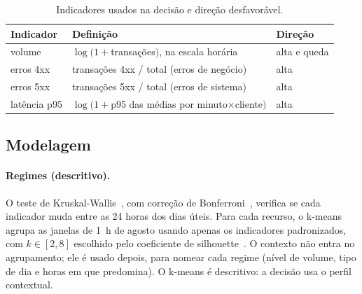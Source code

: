 \documentclass[sigconf,nonacm]{acmart}
\begin{document}
\begin{table}[t]
  \caption{Indicadores usados na decisão e direção desfavorável.}
  \label{tab:atributos}
  \small
  \begin{tabular}{p{}p{}p{}}
    \toprule
    Indicador & Definição & Direção \\
    \midrule
    volume & $\log(1+$transações$)$, na escala horária & alta e queda \\
    erros 4xx & transações 4xx / total (erros de negócio) & alta \\
    erros 5xx & transações 5xx / total (erros de sistema) & alta \\
    latência p95 & $\log(1+$p95 das médias por minuto$\times$cliente$)$ & alta \\
    \bottomrule
  \end{tabular}
\end{table}

\subsection{Modelagem}

\paragraph{Regimes (descritivo).} O teste de Kruskal-Wallis~\citep{kruskal1952ranks}, com correção de Bonferroni~\citep{dunn1961multiple}, verifica se cada indicador muda entre as 24 horas dos dias úteis. Para cada recurso, o k-means~\citep{lloyd1982kmeans} agrupa as janelas de 1~h de agosto usando apenas os indicadores padronizados, com $k\in[2,8]$ escolhido pelo coeficiente de silhouette~\citep{rousseeuw1987silhouette}. O contexto não entra no agrupamento; ele é usado depois, para nomear cada regime (nível de volume, tipo de dia e horas em que predomina). O k-means é descritivo: a decisão usa o perfil contextual.
\end{document}

